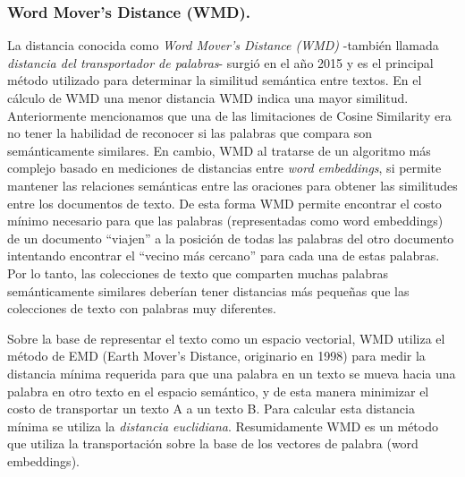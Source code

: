 \documentclass[12pt,a4paper]{article}
\begin{document}
\begin{sloppypar}
\cleardoublepage

\subsubsection{Word Mover’s Distance (WMD).}\label{wmd}

La distancia conocida como \textit{Word Mover’s Distance (WMD)} -también llamada \textit{distancia del transportador de palabras}- surgió en el año 2015\cite{wmd_paper} y es el principal método utilizado para determinar la similitud semántica entre textos\cite{similarity_survey}. En el cálculo de WMD una menor distancia WMD indica una mayor similitud.
Anteriormente mencionamos que una de las limitaciones de Cosine Similarity era no tener la habilidad de reconocer si las palabras que compara son semánticamente similares. En cambio, WMD al tratarse de un algoritmo más complejo basado en mediciones de distancias entre \textit{word embeddings}, si permite mantener las relaciones semánticas entre las oraciones para obtener las similitudes entre los documentos de texto. De esta forma WMD permite encontrar el costo mínimo necesario para que las palabras (representadas como word embeddings) de un documento “viajen” a la posición de todas las palabras del otro documento intentando encontrar el “vecino más cercano” para cada una de estas palabras. Por lo tanto, las colecciones de texto que comparten muchas palabras semánticamente similares deberían tener distancias más pequeñas que las colecciones de texto con palabras muy diferentes\cite{NLP_21}.

Sobre la base de representar el texto como un espacio vectorial, WMD utiliza el método de EMD (Earth Mover’s Distance, originario en 1998)\cite{WMD_3, WMD_4} para medir la distancia mínima requerida para que una palabra en un texto se mueva hacia una palabra en otro texto en el espacio semántico, y de esta manera minimizar el costo de transportar un texto A a un texto B\cite{WMD_5}. Para calcular esta distancia mínima se utiliza la \textit{distancia euclidiana}. Resumidamente WMD es un método que utiliza la transportación sobre la base de los vectores de palabra (word embeddings)\cite{wmd_paper}.


\end{sloppypar}
\end{document}

